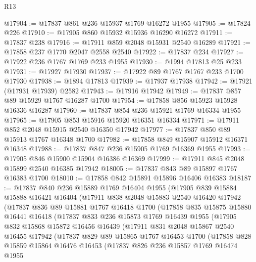 \begin{lexlean}{R13}
\begin{coremodule}
@17904 := @17837 @861 @236 @15937 @1769 @16272 @1955
@17905 := @17824 @226
@17910 := @17905 @860 @15932 @15936 @16290 @16272
@17911 := @17837 @238
@17916 := @17911 @859 @2048 @15931 @2540 @16289
@17921 := @17858 @237 @1770 @2047 @2558 @2540
@17922 := @17837 @234
@17927 := @17922 @236 @1767 @1769 @233 @1955
@17930 := @1994 @17813 @25 @233
@17931 := @17927 @17930
@17937 := @17922 @89 @1767 @1767 @233 @1700 @17930
@17938 := @1894 @17813
@17939 := @17937 @17938
@17942 := @17921 (@17931 @17939) @2582
@17943 := @17916 @17942
@17949 := @17837 @857 @89 @15929 @1767 @16287 @1700
@17954 := @17858 @856 @15923 @15928 @16336 @16287
@17960 := @17837 @854 @236 @15921 @1769 @16334 @1955
@17965 := @17905 @853 @15916 @15920 @16351 @16334
@17971 := @17911 @852 @2048 @15915 @2540 @16350 @17942
@17977 := @17837 @850 @89 @15913 @1767 @16348 @1700
@17982 := @17858 @849 @15907 @15912 @16371 @16348
@17988 := @17837 @847 @236 @15905 @1769 @16369 @1955
@17993 := @17905 @846 @15900 @15904 @16386 @16369
@17999 := @17911 @845 @2048 @15899 @2540 @16385 @17942
@18005 := @17837 @843 @89 @15897 @1767 @16383 @1700
@18010 := @17858 @842 @15891 @15896 @16406 @16383
@18187 := @17837
    @840
    @236
    @15889
    @1769
    @16404
    @1955
    (@17905
      @839
      @15884
      @15888
      @16421
      @16404
      (@17911
        @838
        @2048
        @15883
        @2540
        @16420
        @17942
        (@17837
          @836
          @89
          @15881
          @1767
          @16418
          @1700
          (@17858
            @835
            @15875
            @15880
            @16441
            @16418
            (@17837
              @833
              @236
              @15873
              @1769
              @16439
              @1955
              (@17905
                @832
                @15868
                @15872
                @16456
                @16439
                (@17911
                  @831
                  @2048
                  @15867
                  @2540
                  @16455
                  @17942
                  (@17837
                    @829
                    @89
                    @15865
                    @1767
                    @16453
                    @1700
                    (@17858
                      @828
                      @15859
                      @15864
                      @16476
                      @16453
                      (@17837
                        @826
                        @236
                        @15857
                        @1769
                        @16474
                        @1955

\end{coremodule}
\end{lexlean}
